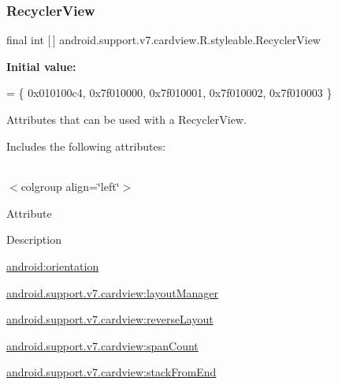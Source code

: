 \subsubsection{\texorpdfstring{Recycler\+View}{RecyclerView}}
{\footnotesize\ttfamily final int \mbox{[}$\,$\mbox{]} android.\+support.\+v7.\+cardview.\+R.\+styleable.\+Recycler\+View\hspace{0.3cm}{\ttfamily [static]}}

{\bfseries Initial value\+:}
\begin{DoxyCode}
= \{
            0x010100c4, 0x7f010000, 0x7f010001, 0x7f010002,
            0x7f010003
        \}
\end{DoxyCode}
Attributes that can be used with a Recycler\+View. 

Includes the following attributes\+:

\tabulinesep=1mm
\begin{longtabu} spread 0pt [c]{*{0}{|X[-1]}|}
\hline
\end{longtabu}
$<$colgroup align=\char`\"{}left\char`\"{}$>$ 

Attribute

Description 

{\ttfamily \hyperlink{classandroid_1_1support_1_1v7_1_1cardview_1_1R_1_1styleable_adf8efb57acf780289db83215a52f10b1}{android\+:orientation}}

{\ttfamily \hyperlink{classandroid_1_1support_1_1v7_1_1cardview_1_1R_1_1styleable_ab2064e02181e4bf21b2e259e1ac81033}{android.\+support.\+v7.\+cardview\+:layout\+Manager}}

{\ttfamily \hyperlink{classandroid_1_1support_1_1v7_1_1cardview_1_1R_1_1styleable_a2aaa2e04e8a3bb8b0988102a9ec55404}{android.\+support.\+v7.\+cardview\+:reverse\+Layout}}

{\ttfamily \hyperlink{classandroid_1_1support_1_1v7_1_1cardview_1_1R_1_1styleable_a35481c2d84bd6e50d39d321c7dd041a6}{android.\+support.\+v7.\+cardview\+:span\+Count}}

{\ttfamily \hyperlink{classandroid_1_1support_1_1v7_1_1cardview_1_1R_1_1styleable_af94123221870052541c69f6f043aa704}{android.\+support.\+v7.\+cardview\+:stack\+From\+End}}

